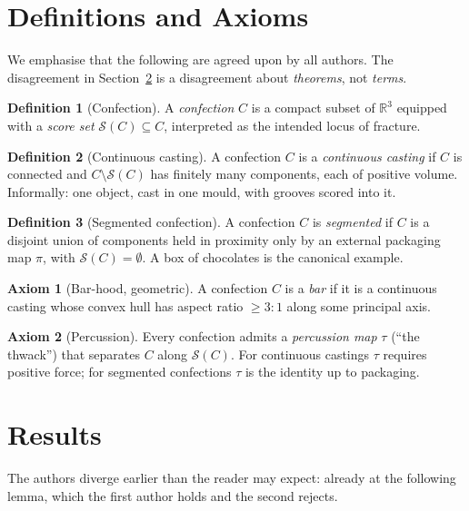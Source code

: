 \documentclass[11pt]{article}
\theoremstyle{plain}
\theoremstyle{definition}
\newtheorem{definition}{Definition}
\newtheorem{axiom}{Axiom}
\theoremstyle{remark}
\newcommand{\score}{\mathcal{S}}
\begin{document}
\section{Definitions and Axioms}\label{sec:defs}

We emphasise that the following are agreed upon by all authors. The
disagreement in Section~\ref{sec:results} is a disagreement about
\emph{theorems}, not \emph{terms}.

\begin{definition}[Confection]
A \emph{confection} \(C\) is a compact subset of \(\mathbb{R}^3\) equipped
with a \emph{score set} \(\score(C) \subseteq C\), interpreted as the
intended locus of fracture.
\end{definition}

\begin{definition}[Continuous casting]
A confection \(C\) is a \emph{continuous casting} if \(C\) is connected and
\(C \setminus \score(C)\) has finitely many components, each of positive
volume. Informally: one object, cast in one mould, with grooves scored
into it.
\end{definition}

\begin{definition}[Segmented confection]
A confection \(C\) is \emph{segmented} if \(C\) is a disjoint union of
components held in proximity only by an external packaging map \(\pi\),
with \(\score(C) = \emptyset\). A box of chocolates is the canonical
example.
\end{definition}

\begin{axiom}[Bar-hood, geometric]\label{ax:bar}
A confection \(C\) is a \emph{bar} if it is a continuous casting whose
convex hull has aspect ratio \(\geq 3{:}1\) along some principal axis.
\end{axiom}

\begin{axiom}[Percussion]\label{ax:perc}
Every confection admits a \emph{percussion map} \(\tau\) (``the thwack'')
that separates \(C\) along \(\score(C)\). For continuous castings \(\tau\)
requires positive force; for segmented confections \(\tau\) is the identity
up to packaging.
\end{axiom}

\section{Results}\label{sec:results}

The authors diverge earlier than the reader may expect: already at the
following lemma, which the first author holds and the second rejects.
\end{document}
